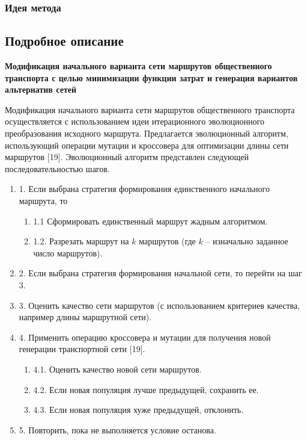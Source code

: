 \subsubsection{Идея метода}
\subsection{Подробное описание}

\textbf{Модификация начального варианта сети маршрутов общественного транспорта с целью минимизации функции 
затрат и генерация вариантов альтернатив сетей}

Модификация начального варианта сети маршрутов общественного транспорта осуществляется с использованием идеи 
итерационного эволюционного преобразования исходного маршрута. Предлагается эволюционный алгоритм, 
использующий операции мутации и кроссовера для оптимизации длины сети маршрутов [19].
Эволюционный алгоритм представлен следующей последовательностью шагов. 
\begin{enumerate}
    \item 1. Если выбрана стратегия формирования единственного начального маршрута, то 
    \begin{enumerate}
        \item 1.1 Сформировать единственный маршрут жадным алгоритмом.
        \item 1.2. Разрезать маршрут на \( k \) маршрутов (где \( k \) -- изначально заданное число 
            маршрутов).
    \end{enumerate}
    \item 2. Если выбрана стратегия формирования начальной сети, то перейти на шаг 3.
    \item 3. Оценить качество сети маршрутов (с использованием критериев качества, например длины 
        маршрутной сети).
    \item 4. Применить операцию кроссовера и мутации для получения новой генерации транспортной сети [19].
    \begin{enumerate}
        \item 4.1. Оценить качество новой сети маршрутов.
        \item 4.2. Если новая популяция лучше предыдущей, сохранить ее.
        \item 4.3. Если новая популяция хуже предыдущей, отклонить. 
    \end{enumerate}
    \item 5. Повторить, пока не выполняется условие останова.
\end{enumerate}

